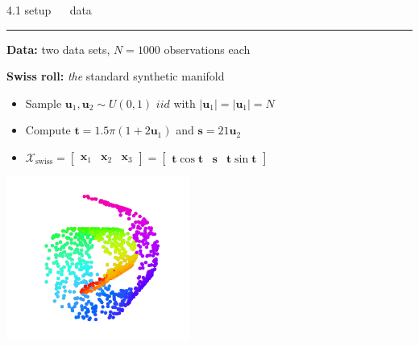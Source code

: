 \documentclass[11pt, compress, t, notes = noshow, xcolor = table, 
aspectratio = 1610]{beamer}
\newcommand{\highlight}[1]{\textcolor{highlightcol}{\textbf{#1}}}
\newcommand{\flexitem}[1]{\item[$\highlight{#1}$]}
\newcommand{\X}{\mathcal{X}}
\newcommand{\x}{\bm{x}}
\begin{document}
\LARGE
\begin{frame}{\textcolor{gray!90}{4.1 setup} ~~ data}
\normalsize
\vspace{-0.5cm}
\noindent \textcolor{gray!90}{\rule{\textwidth}{1pt}}
\smallskip

\textbf{Data:} two data sets, $N = 1000$ observations each

\begin{minipage}[b]{0.65\textwidth}
  \textbf{Swiss roll:} \textit{the} standard synthetic manifold
  \begin{itemize}
    \flexitem{1} Sample $\bm{u}_1, \bm{u}_2 \sim U(0, 1)$ 
    $\mathit{ iid}$ with $\rvert \bm{u}_1 \rvert = \rvert \bm{u}_1 \rvert = N$
    \flexitem{2} Compute $\bm{t} = 1.5 \pi (1 + 2\bm{u}_1)$ and 
    $\bm{s} = 21 \bm{u}_2$
    \flexitem{3} $\X_{\text{swiss}} = 
    \begin{bmatrix} \x_1 & \x_2 & \x_3 \end{bmatrix} =
    \begin{bmatrix} \bm{t} \cos{\bm{t}} & \bm{s} & 
    \bm{t} \sin{\bm{t}} \end{bmatrix}$ 
  \end{itemize}
\end{minipage}%
\begin{minipage}[b]{0.35\textwidth}
  \centering
  \includegraphics[trim = 60 30 40 -20, clip, %
    width = 0.45\textwidth]{figures/swiss_roll}
\end{minipage}

\vspace{0.3cm}


\end{frame}
\end{document}
